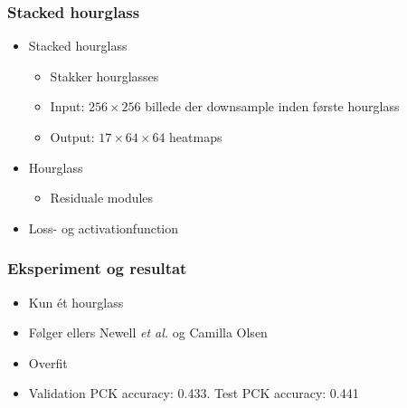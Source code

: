 \documentclass{beamer}
\begin{document}
\begin{frame}
    \frametitle{Stacked hourglass}
    \begin{minipage}{1\textwidth}
        \begin{itemize}
            \item<1-> Stacked hourglass
            \begin{itemize}
                \item Stakker hourglasses
                \item Input: $256 \times 256$ billede der downsample inden første hourglass
                \item Output: $17 \times 64 \times 64$ heatmaps
            \end{itemize}
            \item<2-> Hourglass
            \begin{itemize}
                \item Residuale modules
            \end{itemize}
            \item<3> Loss- og activationfunction
        \end{itemize}
    \end{minipage}
    \begin{minipage}{1\textwidth}
    \end{minipage}
\end{frame}

\begin{frame}
    \frametitle{Eksperiment og resultat}
    \begin{minipage}{\textwidth}
        \begin{itemize}
            \item<1-> Kun ét hourglass
            \item<2-> Følger ellers Newell \textit{et al.} og Camilla Olsen
            \item<3-> Overfit
            \item<4-> Validation PCK accuracy: 0.433. Test PCK accuracy: 0.441
        \end{itemize}
    \end{minipage}
    \begin{minipage}{\textwidth}
    \end{minipage}
\end{frame}
\end{document}
